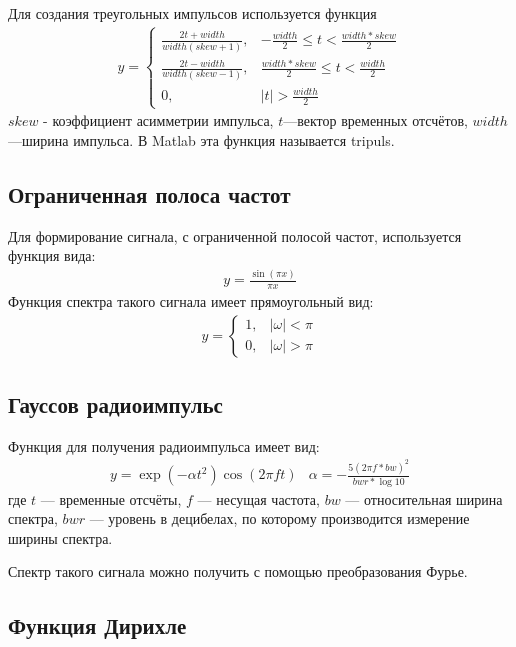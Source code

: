 Для создания треугольных импульсов используется функция
\begin{eqnarray}
y =
\begin{cases}
\frac{2t+width}{width(skew+1)}, & -\frac{width}{2}\leq t < \frac{width*skew}{2}\\
\frac{2t-width}{width(skew-1)}, &  \frac{width*skew}{2}\leq t < \frac{width}{2}\\
0, & |t| > \frac{width}{2}
\end{cases}
\end{eqnarray}
$skew$ - коэффициент асимметрии импульса, $t$---вектор временных отсчётов, $width$---ширина импульса.
В Matlab эта функция называется tripuls.


\subsection{Ограниченная полоса частот}
Для формирование сигнала, с ограниченной полосой частот, используется функция вида:
\begin{eqnarray}
y = \frac{\sin(\pi x)}{\pi x}
\end{eqnarray}
Функция спектра такого сигнала имеет прямоугольный вид:
\begin{eqnarray}
	y =
	\begin{cases}
		1, & |\omega| < \pi \\
		0, & |\omega| > \pi
	\end{cases}
\end{eqnarray}


\subsection{Гауссов радиоимпульс}

Функция для получения радиоимпульса имеет вид:
\begin{eqnarray}
y = \exp(-\alpha t^2)\cos(2\pi f t) & \alpha = -\frac{5(2\pi f *bw)^2}{bwr *\log 10}
\end{eqnarray}
где $t$ --- временные отсчёты, $f$ --- несущая частота, $bw$ --- относительная ширина спектра,
$bwr$ --- уровень в децибелах, по которому производится измерение ширины спектра.

Спектр такого сигнала можно получить с помощью преобразования Фурье.


\subsection{Функция Дирихле}

